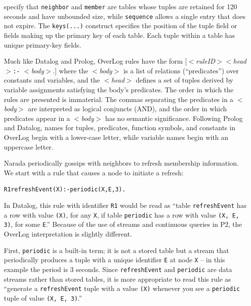 \documentclass{sig-alt-full}
\def\Sys{P2\xspace}
\def\Lang{OverLog\xspace}
\newcommand{\ol}[1]{{\tt\footnotesize#1}}
\newenvironment{overlog}{\begin{alltt}\small}{\end{alltt}}
\begin{document}
\noindent{}specify that \ol{neighbor} and \ol{member} are tables whose tuples
are retained for 120 seconds and have unbounded size, while
\ol{sequence} allows a single entry that does not expire.  The
\ol{keys(...)} construct specifies the position of the tuple field or
fields making up the primary key of each table. Each tuple within a
table has unique primary-key fields.

\def\LangBody{$<$\textit{body}$>$\xspace}
\def\LangHead{$<$\textit{head}$>$\xspace}
\def\LangRuleID{$<$\textit{ruleID}$>$\xspace}

Much like Datalog and Prolog,
\Lang rules have the form 
[\LangRuleID \LangHead \ol{:-} \LangBody .]
where the \LangBody is a list
of relations (``predicates'') over constants and variables, and the
\LangHead defines a set of tuples derived by variable assignments
satisfying the body's predicates. 
The order in which the rules are presented is immaterial.  The commas
separating the predicates in a \LangBody are interpreted as logical
conjuncts (AND), and the order in which predicates appear in a \LangBody
has no semantic significance.  Following Prolog
and Datalog, names for tuples, predicates, function symbols, and
constants in \Lang begin with a lower-case letter, while variable
names begin with an uppercase letter.  

Narada periodically gossips with neighbors to refresh membership
information. We start with a rule that causes a node to initiate
a refresh:

\begin{overlog}
R1 refreshEvent(X) :- periodic(X, E, 3).
\end{overlog}

\noindent{}In Datalog, this rule with identifier \ol{R1}
would be read as ``table
\ol{refreshEvent} has a row with value \ol{(X)}, for any
\ol{X}, if table \ol{periodic} has a row with value \ol{(X, E, 3)}, for
some \ol{E}.''  Because of the use of streams and continuous queries in
\Sys, the \Lang interpretation is slightly different.

First, \ol{periodic} is a built-in term; it is not a stored table
but a stream that periodically produces a tuple with a unique identifier
\ol{E} at node \ol{X} -- in this example the period is 3
seconds.  Since \ol{refreshEvent} and \ol{periodic} are data streams
rather than stored tables, it is more appropriate to read this
rule as ``generate a
\ol{refreshEvent} tuple with a value \ol{(X)} whenever you see a 
\ol{periodic} tuple of value \ol{(X, E, 3)}.''
\end{document}
